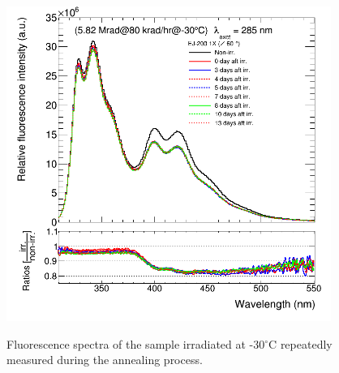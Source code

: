 \documentclass[preprint]{elsarticle}
\begin{document}
\begin{figure}[!ht]
	\centering
	\caption{Fluorescence spectra of the sample irradiated at -30$^\circ$C repeatedly measured during the annealing process.}
	\includegraphics[width=300pt]{./figures/appendix2.png}
	\label{fig:app2}
\end{figure}



{}






\end{document}
